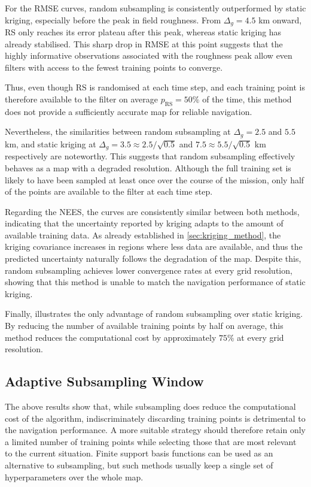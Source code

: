 For the RMSE curves, random subsampling is consistently outperformed by static kriging, especially before the peak in field roughness. From $\Delta_g=4.5$ km onward, RS only reaches its error plateau after this peak, whereas static kriging has already stabilised. This sharp drop in RMSE at this point suggests that the highly informative observations associated with the roughness peak allow even filters with access to the fewest training points to converge.

Thus, even though RS is randomised at each time step, and each training point is therefore available to the filter on average $p_{\mathrm{RS}}=50\%$ of the time, this method does not provide a sufficiently accurate map for reliable navigation.

Nevertheless, the similarities between random subsampling at $\Delta_g=2.5$ and $5.5$ km, and static kriging at $\Delta_g=3.5\approx2.5/\sqrt{0.5}$ and $7.5\approx5.5/\sqrt{0.5}$ km respectively are noteworthy. This suggests that random subsampling effectively behaves as a map with a degraded resolution. Although the full training set is likely to have been sampled at least once over the course of the mission, only half of the points are available to the filter at each time step.

Regarding the NEES, the curves are consistently similar between both methods, indicating that the uncertainty reported by kriging adapts to the amount of available training data. As already established in \cref{sec:kriging_method}, the kriging covariance increases in regions where less data are available, and thus the predicted uncertainty naturally follows the degradation of the map. Despite this, random subsampling achieves lower convergence rates at every grid resolution, showing that this method is unable to match the navigation performance of static kriging.

Finally,  illustrates the only advantage of random subsampling over static kriging. By reducing the number of available training points by half on average, this method reduces the computational cost by approximately $75\%$ at every grid resolution.

\subsection{Adaptive Subsampling Window}\label{sec:AK}

The above results show that, while subsampling does reduce the computational cost of the algorithm, indiscriminately discarding training points is detrimental to the navigation performance. A more suitable strategy should therefore retain only a limited number of training points while selecting those that are most relevant to the current situation. Finite support basis functions \cite{bib:local-basis-functions} can be used as an alternative to subsampling, but such methods usually keep a single set of hyperparameters over the whole map. 

